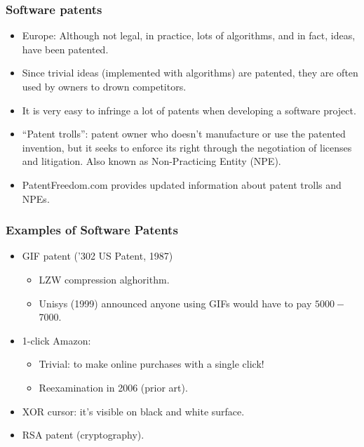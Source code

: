 \documentclass{beamer}
\begin{document}
\begin{frame}
\frametitle{Software patents}

\begin{itemize}
\item Europe: Although not legal, in
  practice, lots of algorithms, and in fact, ideas, have been
  patented.
\item Since trivial ideas (implemented with algorithms) are patented,
  they are often used by owners to drown competitors.
\item It is very easy to infringe a lot of patents when developing a software project.
\item ``\alert{Patent trolls}'': patent owner who doesn't manufacture or use the patented invention, but it seeks to enforce its right through the negotiation of licenses and litigation.
Also known as \alert{Non-Practicing Entity} (NPE).
\item PatentFreedom.com provides updated information about patent trolls and NPEs.
\end{itemize}

\end{frame}

\begin{frame}
\frametitle{Examples of Software Patents}

\begin{itemize}
\item GIF patent ('302 US Patent, 1987) 
	\begin{itemize}
	\item LZW compression alghorithm.
	\item Unisys (1999) announced anyone using GIFs would have to pay $5000-$7000.
	\end{itemize} 
\item 1-click Amazon: 
	\begin{itemize}
	\item Trivial: to make online purchases with a single click!
	\item Reexamination in 2006 (prior art).
	\end{itemize} 
\item XOR cursor: it's visible on black and white surface.
\item RSA patent (cryptography).
\end{itemize}                                                 

\end{frame}
\end{document}
